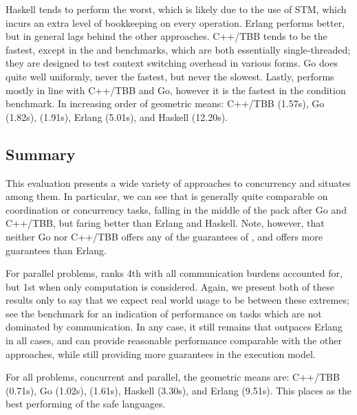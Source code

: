 Haskell tends to perform the worst,
which is likely due to the use of STM,
which incurs an extra level of bookkeeping on every
operation.
Erlang performs better, but in general lags behind the other approaches.
C++/TBB tends to be the fastest, except in the
 and  benchmarks,
which are both essentially single-threaded;
they are designed to test context switching overhead in various forms.
Go does quite well uniformly, never the fastest,
but never the slowest.
Lastly, {\qsname} performs mostly in line with C++/TBB and Go,
however it is the fastest in the condition benchmark.
In increasing order of geometric means:
C++/TBB (1.57s),
Go (1.82s),
{\qsname} (1.91s),
Erlang (5.01s), and
Haskell (12.20s).


\subsection{Summary}
This evaluation presents a wide variety of approaches
to concurrency and situates {\qsname} among them.
In particular,
we can see that {\qsname} is generally quite comparable
on coordination or concurrency tasks,
falling in the middle of the pack after Go and C++/TBB,
but faring better than Erlang and Haskell.
Note, however, that neither Go nor C++/TBB offers
any of the guarantees of {\qsname},
and {\qsname} offers more guarantees than Erlang.

For parallel problems, {\qsname} ranks 4th with all communication
burdens accounted for, but 1st when only computation is considered.
Again, we present both of these results only to say that
we expect real world usage to be between these extremes;
see the  benchmark for an indication of performance
on tasks which are not dominated by communication.
In any case, it still remains that {\qsname} outpaces Erlang in all cases,
and can provide reasonable performance comparable with the other approaches,
while still providing more guarantees in the execution model.

\begin{sloppypar}
For all problems, concurrent and parallel,
the geometric means are:
C++/TBB (0.71s),
Go (1.02s),
{\qsname} (1.61s),
Haskell (3.30s), and
Erlang (9.51s).
This places {\qsname} as the best performing of the
safe languages.
\end{sloppypar}